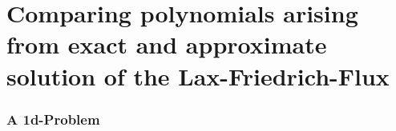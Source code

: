 \documentclass{beamer}
\renewcommand{\phi}{\varphi}
\begin{document}

\part{Comparing polynomials arising from exact and approximate solution of the Lax-Friedrich-Flux}
\label{part:polynomialstuff}

\section{A 1d-Problem}
\label{sec:interpretation-as-1d-problem}

\newcommand{\twopoints}[3]{
  \draw[fill=#3] (#1,#2) circle (0.05);
  \draw[xshift=0.1cm,yshift=0.1cm,fill=#3] (#1,#2) circle (0.05);
}
\end{document}

